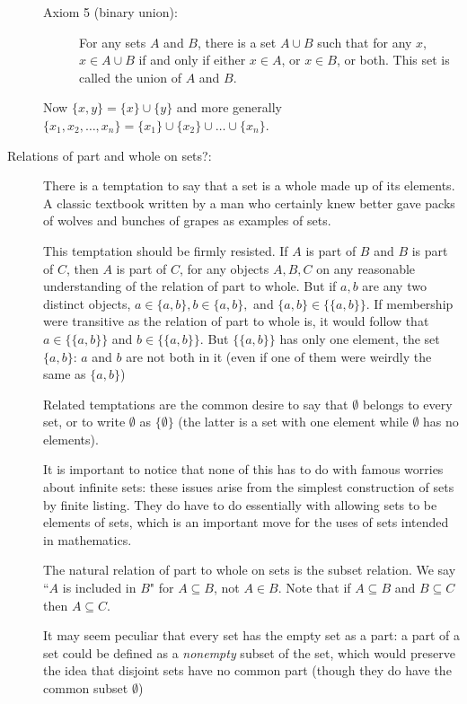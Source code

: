 \documentclass[12pt]{article}
\begin{document}
\begin{description}
\begin{description}
\item[Axiom 5 (binary union):]  For any sets $A$ and $B$, there is a set $A \cup B$ such that for any $x$, $x \in A \cup B$ if and only if 
either $x \in A$, or $x \in B$, or both.  This set is called the union of $A$ and $B$.
\end{description}

Now $\{x,y\} = \{x\} \cup \{y\}$ and more generally $\{x_1,x_2,\ldots,x_n\} = \{x_1\} \cup \{x_2\} \cup \ldots \cup \{x_n\}$.

\item[Relations of part and whole on sets?:]  There is a temptation to say that a set is a whole made up of its elements.
A classic textbook written by a man who certainly knew better gave packs of wolves and bunches of grapes as examples of sets.

This temptation should be firmly resisted.  If $A$ is part of $B$ and $B$ is part of $C$, then $A$ is part of $C$, for any objects $A,B,C$ on any reasonable understanding of the relation of part to whole.  But if $a,b$ are any two distinct objects, $a \in \{a,b\}, b \in \{a,b\},$ and $\{a,b\} \in \{\{a,b\}\}$.  If membership were transitive as the relation of part to whole is, it would follow that $a \in \{\{a,b\}\}$ and $b \in \{\{a,b\}\}$.  But $\{\{a,b\}\}$ has only one element, the set $\{a,b\}$:  $a$ and $b$ are not both in it (even if one of them were weirdly the same as $\{a,b\}$)

Related temptations are the common desire to say that $\emptyset$ belongs to every set, or to write $\emptyset$
as $\{\emptyset\}$ (the latter is a set with one element while $\emptyset$ has no elements).

It is important to notice that none of this has to do with famous worries about infinite sets:  these issues arise from the simplest construction of sets by finite listing.  They do have to do essentially with allowing sets to be elements of sets, which is an important move for the uses of sets intended in mathematics.

The natural relation of part to whole on sets is the subset relation.  We say ``$A$ is included in $B$" for $A \subseteq B$, not $A \in B$.  Note that if $A \subseteq B$ and $B \subseteq C$ then $A \subseteq C$.

It may seem peculiar that every set has the empty set as a part:  a part of a set could be defined as a {\em nonempty\/} subset of the set, which would preserve the idea that disjoint sets have no common part (though they do have the common subset $\emptyset$)


\end{description}
\end{document}
